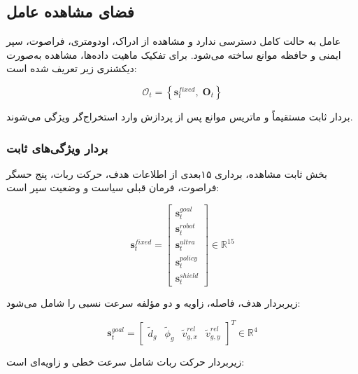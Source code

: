 \subsection{فضای مشاهده عامل}
\label{subsec:observation_space_final}

عامل به حالت کامل دسترسی ندارد و مشاهده از ادراک، اودومتری، فراصوت، سپر ایمنی و حافظه موانع ساخته می‌شود. برای تفکیک ماهیت داده‌ها، مشاهده به‌صورت دیکشنری زیر تعریف شده است:

\begin{equation}
	\mathcal{O}_t =
	\left\{
	\mathbf{s}^{fixed}_t,\;
	\mathbf{O}_t
	\right\}
	\label{eq:dict_observation_final}
\end{equation}

بردار ثابت مستقیماً و ماتریس موانع پس از پردازش  وارد استخراج‌گر ویژگی می‌شوند.

\subsubsection{بردار ویژگی‌های ثابت}
\label{subsubsec:fixed_features_final}

بخش ثابت مشاهده، برداری ۱۵بعدی از اطلاعات هدف، حرکت ربات، پنج حسگر فراصوت، فرمان قبلی سیاست و وضعیت سپر است:

\begin{equation}
	\mathbf{s}^{fixed}_t =
	\begin{bmatrix}
		\mathbf{s}^{goal}_t \\
		\mathbf{s}^{robot}_t \\
		\mathbf{s}^{ultra}_t \\
		\mathbf{s}^{policy}_t \\
		\mathbf{s}^{shield}_t
	\end{bmatrix}
	\in \mathbb{R}^{15}
	\label{eq:fixed_obs_15d_final}
\end{equation}

زیر‌بردار هدف، فاصله، زاویه و دو مؤلفه سرعت نسبی را شامل می‌شود:

\begin{equation}
	\mathbf{s}^{goal}_t =
	\begin{bmatrix}
		\tilde{d}_g &
		\tilde{\phi}_g &
		\tilde{v}^{rel}_{g,x} &
		\tilde{v}^{rel}_{g,y}
	\end{bmatrix}^{T}
	\in \mathbb{R}^{4}
	\label{eq:goal_fixed_features}
\end{equation}

زیر‌بردار حرکت ربات شامل سرعت خطی و زاویه‌ای است:

